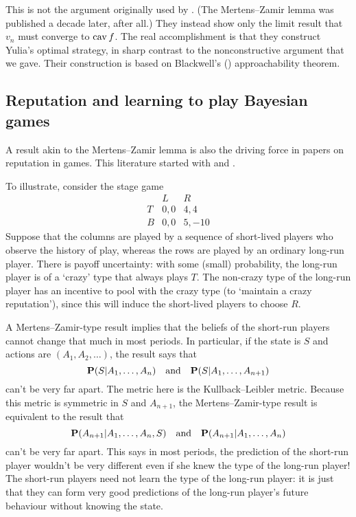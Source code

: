 \documentclass[11pt,letterpaper,reqno,oneside]{article}
\begin{document}
This is not the argument originally used by \textcite{AumannMaschler1995}. (The Mertens--Zamir lemma was published a decade later, after all.) They instead show only the limit result that $v_n$ must converge to $\operatorname*{cav} f$. The real accomplishment is that they construct Yulia's optimal strategy, in sharp contrast to the nonconstructive argument that we gave. Their construction is based on Blackwell's (\citeyear{Blackwell1956}) approachability theorem.



\subsection{Reputation and learning to play Bayesian games}
\label{sec:learning:reputation_learning}

A result akin to the Mertens--Zamir lemma is also the driving force in papers on reputation in games. This literature started with \textcite{KrepsEtAl1982} and \textcite{FudenbergLevine1989,FudenbergLevine1992}.

To illustrate, consider the stage game
%
\begin{equation*}
	\begin{array}{c|ccc}
		  & L & R \\ \hline
		T & 0,0 & 4,4 \\
		B & 0,0 & 5,-10
	\end{array} 
\end{equation*}
%
Suppose that the columns are played by a sequence of short-lived players who observe the history of play, whereas the rows are played by an ordinary long-run player. There is payoff uncertainty: with some (small) probability, the long-run player is of a `crazy' type that always plays $T$. The non-crazy type of the long-run player has an incentive to pool with the crazy type (to `maintain a crazy reputation'), since this will induce the short-lived players to choose $R$.

A Mertens--Zamir-type result implies that the beliefs of the short-run players cannot change that much in most periods. In particular, if the state is $S$ and actions are $(A_1,A_2,\dots)$, the result says that
%
\begin{equation*}
	\mathbf{P}( S | A_1,\dots,A_n )
	\quad\text{and}\quad
	\mathbf{P}( S | A_1,\dots,A_{n+1} )
\end{equation*}
%
can't be very far apart. The metric here is the Kullback--Leibler metric. Because this metric is symmetric in $S$ and $A_{n+1}$, the Mertens--Zamir-type result is equivalent to the result that
%
\begin{equation*}
	\mathbf{P}( A_{n+1} | A_1,\dots,A_n,S )
	\quad\text{and}\quad
	\mathbf{P}( A_{n+1} | A_1,\dots,A_n )
\end{equation*}
%
can't be very far apart. This says in most periods, the prediction of the short-run player wouldn't be very different even if she knew the type of the long-run player! The short-run players need not learn the type of the long-run player: it is just that they can form very good predictions of the long-run player's future behaviour without knowing the state.
\end{document}
